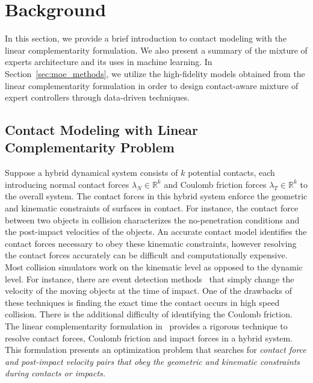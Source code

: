
\section{Background}

In this section, we provide a brief introduction to contact modeling with the
linear complementarity formulation.
%
We also present a summary of the mixture of experts architecture and
its uses in machine learning.
%
In Section~\ref{sec:moe_methods}, we utilize the high-fidelity models obtained
from the linear complementarity formulation in order to design contact-aware
mixture of expert controllers through data-driven techniques.

\subsection{Contact Modeling with Linear Complementarity Problem}

Suppose a hybrid dynamical system consists of $k$ potential contacts, each
introducing normal contact forces $\lambda_N \in \mathbb{R}^{k}$ and Coulomb
friction forces $\lambda_T \in \mathbb{R}^{k}$ to the overall system.
%
The contact forces in this hybrid system enforce the geometric and kinematic
constraints of surfaces in contact.
%
For instance, the contact force between two objects in collision characterizes
the no-penetration conditions and the post-impact velocities of the objects.
%
An accurate contact model identifies the contact forces necessary to obey these
kinematic constraints, however resolving the contact forces accurately can be
difficult and computationally expensive.
%
Most collision simulators work on the kinematic level as opposed to the dynamic
level.
%
For instance, there are event detection methods~\cite{cellier1986combined} that
simply change the velocity of the moving objects at the time of impact.
%
One of the drawbacks of these techniques is finding the exact time the contact
occurs in high speed collision.
%
There is the additional difficulty of identifying the Coulomb friction.
%
The linear complementarity formulation in~\cite{glocker2005formulation} provides
a rigorous technique to resolve contact forces, Coulomb friction and impact
forces in a hybrid system.
%
This formulation presents an optimization problem that searches for \it{contact force
and post-impact velocity} \normalfont pairs that obey the geometric and
kinematic constraints during contacts or impacts.
%

